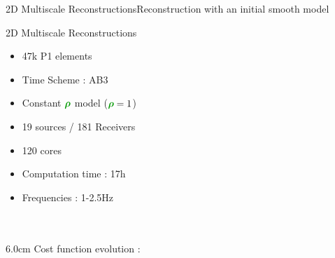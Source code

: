 \begin{frame}[noframenumbering]{2D Multiscale Reconstructions}{Reconstruction with an initial smooth model}
  \vspace{-0.5cm}
  \renewcommand{\modelfile}{fig/marmousi_filter_5}
  \renewcommand{\modeltitle}{Reconstructed $\velocity$ Model with \textcolor{red}{1.0-15Hz} filter}
  \begin{figure}
        \hfill
  \end{figure}
  \vspace{-1cm}
  \renewcommand{\modeltitle}{Target $\velocity$ Model}
  \renewcommand{\modelfile}{fig/marmousi_target}
  \begin{figure}
        \hfill
   \end{figure}
\end{frame}




\begin{frame}{2D Multiscale Reconstructions}

  \begin{multicols}{2}
    \begin{itemize}
    \item 47k P1 elements
    \item Time Scheme : AB3
    \item Constant $\density$ model ($\density=1$)
    \item 19 sources / 181 Receivers
    \item 120 cores
    \item Computation time : 17h
    \item Frequencies : \textcolor{pink!60!black}{1-2.5Hz} \\ ~ \\ ~
    \end{itemize}
    \columnbreak

    \setlength{\plotwidth} {6.0cm}
    \setlength{\plotheight}{5cm}
    Cost function evolution :
    \begin{figure}
    \end{figure}
  \end{multicols}
\end{frame}

